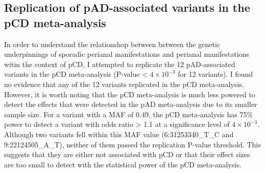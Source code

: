 \subsection{Replication of pAD-associated variants in the pCD meta-analysis}
In order to understand the relationshop between between the genetic underpinnings of sporadic perianal manifestations and perianal manifestations witin the context of pCD, I attempted to replicate the 12 pAD-associated variants in the pCD meta-analysis (P-value < $4\times10^{-3}$ for 12 variants). I found no evidence that any of the 12 variants replicated in the pCD meta-analysis. However, it is worth noting that the pCD meta-analysis is much less powered to detect the effects that were detected in the pAD meta-analysis due to its smaller sample size. For a variant with a MAF of 0.49, the pCD meta-analysis has 75\% power to detect a variant with odds ratio > 1.1 at a significance level of $4\times10^{-3}$. Although two variants fell within this MAF value (6:31253340\_T\_C and 9:22124505\_A\_T), neither of them passed the replication P-value threshold. This suggests that they are either not associated with pCD or that their effect sizes are too small to detect with the statistical power of the pCD meta-analysis. 
